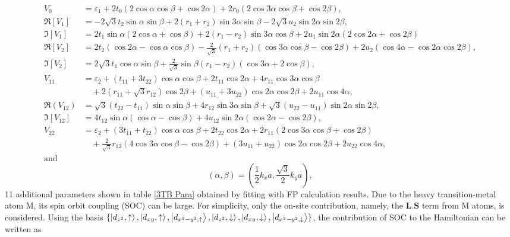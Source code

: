 \documentclass[12pt,english,a4paper]{article}
\begin{document}
	\begin{align*}
		V_0 &= \varepsilon_1 + 2t_0 (2\cos\alpha\cos\beta + \cos2\alpha) + 2r_0 (2\cos3\alpha\cos\beta+\cos2\beta),\\
		\Re[V_1]&= -2\sqrt{3}t_2 \sin \alpha \sin \beta + 2(r_1 + r_2)\sin 3 \alpha \sin \beta - 2\sqrt{3} u_2 \sin 2\alpha \sin 2\beta,\\
		\Im[V_1] &= 2 t_1 \sin \alpha (2 \cos \alpha +\cos \beta) + 2(r_1 - r_2) \sin 3\alpha \cos \beta + 2u_1 \sin 2\alpha (2\cos 2\alpha + \cos 2\beta)\\
		\Re[V_2] &= 2t_2 (\cos 2\alpha - \cos \alpha \cos \beta) -\frac{2}{\sqrt{3}} (r_1 + r_2 ) (\cos 3\alpha \cos \beta - \cos 2 \beta) + 2u_2 (\cos 4\alpha -\cos 2\alpha \cos 2\beta),\\
		\Im[V_2] &= 2\sqrt{3} t_1 \cos \alpha \sin \beta +\frac{2}{\sqrt{3}} \sin \beta (r_1 -r_2 )(\cos 3\alpha + 2\cos \beta),\\
		V_{11} & = \varepsilon_2 + (t_{11}+3t_{22})\cos \alpha \cos \beta + 2 t_{11} \cos 2\alpha + 4r_{11} \cos 3\alpha \cos \beta \\ &\quad +2 (r_{11} + \sqrt{3} r_{12}) \cos 2\beta + (u_{11} + 3 u_{22})\cos 2 \alpha \cos 2\beta + 2 u_{11} \cos 4\alpha,\\
		\Re(V_{12}) &= \sqrt{3} (t_{22} - t_{11}) \sin \alpha \sin \beta +4 r_{12} \sin 3\alpha \sin \beta + \sqrt{3} (u_{22} - u_{11}) \sin 2\alpha \sin 2\beta,\\
		\Im[V_{12}] &= 4 t_{12} \sin \alpha (\cos \alpha -\cos \beta) + 4u_{12} \sin 2\alpha (\cos 2\alpha - \cos 2\beta),\\
		V_{22} &= \varepsilon_2 +(3t_{11} + t_{22}) \cos \alpha \cos \beta + 2 t_{22} \cos 2 \alpha + 2 r_{11}(2\cos 3\alpha \cos \beta + \cos 2 \beta) \\&\quad + \frac{2}{\sqrt{3}} r_{12} (4\cos 3\alpha \cos \beta - \cos 2\beta) + (3 u_{11} + u_{22}) \cos 2\alpha \cos 2\beta + 2u_{22} \cos 4\alpha,\\
		\text{and}&
		\end{align*}
		\begin{equation}		
			(\alpha,\beta) =  (\frac{1}{2}k_x a, \frac{\sqrt{3}}{2}k_y a),
		\end{equation}
11 additional parameters shown in table \ref{3TB Para} obtained by fitting with FP calculation results. Due to the heavy transition-metal atom M, its spin orbit coupling (SOC) can be large. For simplicity, only the on-site contribution, namely, the $\textbf{L}.\textbf{S}$ term from M atoms, is considered. Using the basis $\{\ket{d_{z^2},\uparrow},\ket{d_{xy},\uparrow},\ket{d_{x^2-y^2,\uparrow}},\ket{d_{z^2},\downarrow},\ket{d_{xy},\downarrow},\ket{d_{x^2-y^2,\downarrow}}\}$, the contribution of SOC to the Hamiltonian can be written as
\end{document}
